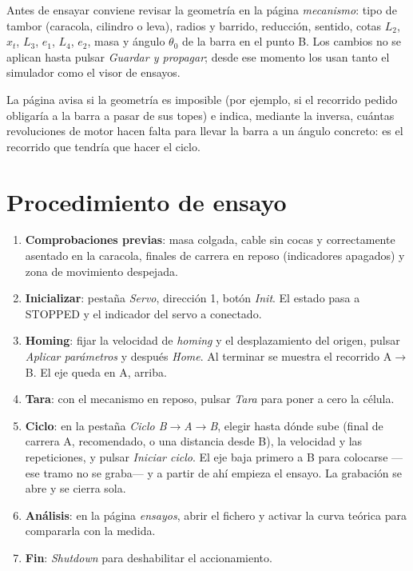 Antes de ensayar conviene revisar la geometría en la página \emph{mecanismo}: tipo de tambor
(caracola, cilindro o leva), radios y barrido, reducción, sentido, cotas $L_2$, $x_t$, $L_3$, $e_1$,
$L_4$, $e_2$, masa y ángulo $\theta_0$ de la barra en el punto B. Los cambios no se aplican hasta pulsar \emph{Guardar y propagar};
desde ese momento los usan tanto el simulador como el visor de ensayos.

La página avisa si la geometría es imposible (por ejemplo, si el recorrido pedido obligaría a la
barra a pasar de sus topes) e indica, mediante la inversa, cuántas revoluciones de motor hacen falta
para llevar la barra a un ángulo concreto: es el recorrido que tendría que hacer el ciclo.

\section{Procedimiento de ensayo}

\begin{enumerate}
  \item \textbf{Comprobaciones previas}: masa colgada, cable sin cocas y correctamente asentado en la
        caracola, finales de carrera en reposo (indicadores apagados) y zona de movimiento despejada.
  \item \textbf{Inicializar}: pestaña \emph{Servo}, dirección 1, botón \emph{Init}. El estado pasa a
        STOPPED y el indicador del servo a conectado.
  \item \textbf{Homing}: fijar la velocidad de \emph{homing} y el desplazamiento del origen, pulsar
        \emph{Aplicar parámetros} y después \emph{Home}. Al terminar se muestra el recorrido
        A$\rightarrow$B. El eje queda en A, arriba.
  \item \textbf{Tara}: con el mecanismo en reposo, pulsar \emph{Tara} para poner a cero la célula.
  \item \textbf{Ciclo}: en la pestaña \emph{Ciclo B$\rightarrow$A$\rightarrow$B}, elegir hasta dónde
        sube (final de carrera A, recomendado, o una distancia desde B), la velocidad y las
        repeticiones, y pulsar \emph{Iniciar ciclo}. El eje baja primero a B para colocarse ---ese
        tramo no se graba--- y a partir de ahí empieza el ensayo. La grabación se abre y se cierra
        sola.
  \item \textbf{Análisis}: en la página \emph{ensayos}, abrir el fichero y activar la curva teórica
        para compararla con la medida.
  \item \textbf{Fin}: \emph{Shutdown} para deshabilitar el accionamiento.
\end{enumerate}

